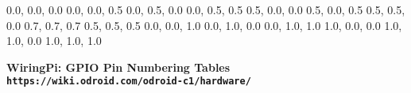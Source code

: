 \documentclass[12pt,a4paper]{article}
\begin{document}
\begin{sffamily}
\definecolor{rtb-black}{rgb}  {0.0, 0.0, 0.0}
\definecolor{rtb-navy}{rgb}   {0.0, 0.0, 0.5}
\definecolor{rtb-green}{rgb}  {0.0, 0.5, 0.0}
\definecolor{rtb-teal}{rgb}   {0.0, 0.5, 0.5}
\definecolor{rtb-maroon}{rgb} {0.5, 0.0, 0.0}
\definecolor{rtb-purple}{rgb} {0.5, 0.0, 0.5}
\definecolor{rtb-olive}{rgb}  {0.5, 0.5, 0.0}
\definecolor{rtb-silver}{rgb} {0.7, 0.7, 0.7}
\definecolor{rtb-grey}{rgb}   {0.5, 0.5, 0.5}
\definecolor{rtb-blue}{rgb}   {0.0, 0.0, 1.0}
\definecolor{rtb-lime}{rgb}   {0.0, 1.0, 0.0}
\definecolor{rtb-aqua}{rgb}   {0.0, 1.0, 1.0}
\definecolor{rtb-red}{rgb}    {1.0, 0.0, 0.0}
\definecolor{rtb-yellow}{rgb} {1.0, 1.0, 0.0}
\definecolor{rtb-white}{rgb}  {1.0, 1.0, 1.0}

\begin{center}
\bfseries{WiringPi: GPIO Pin Numbering Tables}\\
\tt{https://wiki.odroid.com/odroid-c1/hardware/}
\end{center}


\end{sffamily}
\end{document}
